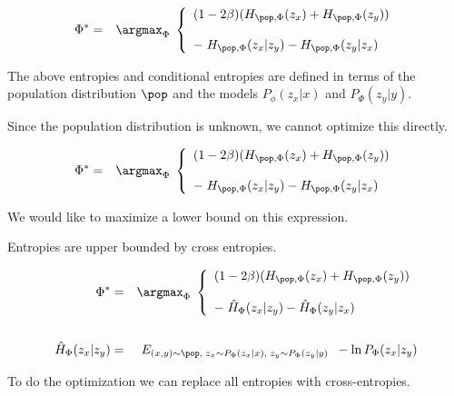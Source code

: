 {

\begin{eqnarray*}
\Phi^* & = & \argmax_{\Phi} \; \left\{\begin{array}{l}(1-2\beta)(H_{\pop,\Phi}(z_x)+ H_{\pop,\Phi}(z_y)) \\
\\
-\; H_{\pop,\Phi}(z_x|z_y) - H_{\pop,\Phi}(z_y|z_x) \end{array}\right.
\end{eqnarray*}

\vfill
The above entropies and conditional entropies are defined in terms of the population distribution $\pop$ and the models $P_\phi(z_x|x)$ and $P_\Phi(z_y|y)$.

\vfill
Since the population distribution is unknown, we cannot optimize this directly.


{\huge
\begin{eqnarray*}
\Phi^* & = & \argmax_{\Phi} \; \left\{\begin{array}{l}(1-2\beta)(H_{\pop,\Phi}(z_x)+ H_{\pop,\Phi}(z_y)) \\
\\
-\; H_{\pop,\Phi}(z_x|z_y) - H_{\pop,\Phi}(z_y|z_x) \end{array}\right.
\end{eqnarray*}
}

\vfill
We would like to maximize a lower bound on this expression.

\vfill
Entropies are upper bounded by cross entropies.

\vfill
{\huge
\begin{eqnarray*}
\Phi^* & = & \argmax_{\Phi} \; \left\{\begin{array}{l}(1-2\beta)(H_{\pop,\Phi}(z_x)+ H_{\pop,\Phi}(z_y)) \\
\\
-\; \hat{H}_{\Phi}(z_x|z_y) - \hat{H}_{\Phi}(z_y|z_x) \end{array}\right.\\
\\
\hat{H}_\Phi(z_x|z_y) & = & E_{(x,y)\sim \pop,\;z_x\sim P_\Phi(z_x|x),\;z_y \sim P_\Phi(z_y|y)}\;\;-\ln P_\Phi(z_x|z_y)
\end{eqnarray*}
}



To do the optimization we can replace all entropies with cross-entropies.

}

